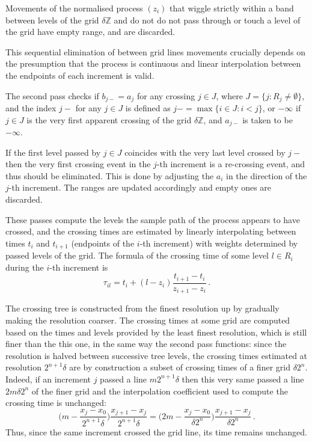\documentclass[a4paper]{article}
\begin{document}
Movements of the normalised process $(z_i)$ that wiggle strictly within a band between
levels of the grid $\delta \mathbb{Z}$ and do not do not pass through or touch a level
of the grid have empty range, and are discarded.

This sequential elimination of between grid lines movements crucially depends on
the presumption that the process is continuous and linear interpolation between
the endpoints of each increment is valid.

The second pass checks if $b_{j-} = a_j$ for any crossing $j\in J$, where
$J = \{j : R_j\neq \emptyset\}$, and the index $j-$ for any $j\in J$ is defined as
$j- = \max\{i\in J : i < j\}$, or $-\infty$ if $j\in J$ is the very first apparent
crossing of the grid $\delta \mathbb{Z}$, and $a_{j-}$ is taken to be $-\infty$.

If the first level passed by $j\in J$ coincides with the very last level crossed
by $j-$ then the very first crossing event in the $j$-th increment is a re-crossing
event, and thus should be eliminated. This is done by adjusting the $a_i$ in the
direction of the $j$-th increment. The ranges are updated accordingly and empty
ones are discarded.

These passes compute the levels the sample path of the process appears to have
crossed, and the crossing times are estimated by linearly interpolating between
times $t_i$ and $t_{i+1}$ (endpoints of the $i$-th increment) with weights determined
by passed levels of the grid. The formula of the crossing time of some level $l\in R_i$
during the $i$-th increment is
\[ \tau_{il} = t_i + (l - z_i) \frac{t_{i+1} - t_i}{z_{i+1} - z_i} \,. \]

The crossing tree is constructed from the finest resolution up by gradually making
the resolution coarser. The crossing times at some grid are computed based on the 
times and levels provided by the least finest resolution, which is still finer than
the this one, in the same way the second pass functions: since the resolution is
halved between successive tree levels, the crossing times estimated at resolution
$2^{n+1} \delta$ are by construction a subset of crossing times of a finer grid
$\delta 2^n$. Indeed, if an increment $j$ passed a line $m 2^{n+1} \delta$ then
this very same passed a line $2m \delta 2^n$ of the finer grid and the interpolation
coefficient used to compute the crossing time is unchanged:
\[
    \biggl( m - \frac{x_j - x_0}{2^{n+1} \delta} \biggr) \frac{x_{j+1} - x_j}{2^{n+1} \delta}
    = \biggl( 2m - \frac{x_j - x_0}{\delta 2^n} \biggr) \frac{x_{j+1} - x_j}{\delta 2^n} \,.
\]
Thus, since the same increment crossed the grid line, its time remains unchanged.
\end{document}
